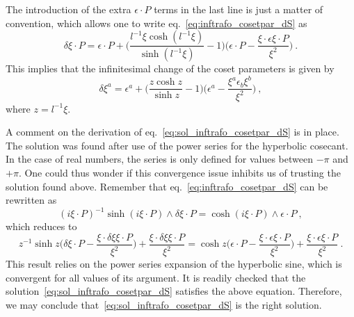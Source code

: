 \documentclass[11pt]{article}
\begin{document}
The introduction of the extra $\epsilon\cdot P$ terms in the last 
line is just a matter of convention, which allows one to write 
eq.~\eqref{eq:inftrafo_cosetpar_dS} as
\begin{equation}\label{eq:sol_inftrafo_cosetpar_dS}
	\delta\xi \cdot P = \epsilon\cdot P + 
	\bigg(\frac{l^{-1}\xi\cosh(l^{-1}\xi)}{\sinh(l^{-1}\xi)} - 
	1\bigg) \bigg(\epsilon\cdot P - \frac{\xi\cdot\epsilon 
		\xi\cdot P}{\xi^2}\bigg)~.
\end{equation}
This implies that the infinitesimal change of the coset 
parameters is given by
%
\begin{equation}
	\delta\xi^a = \epsilon^a + \Big(\frac{z\cosh z}{\sinh z} - 
	1\Big) \bigg(\epsilon^a - \frac{\xi^a \epsilon_b 
		\xi^b}{\xi^2}\bigg)~,
\end{equation}
where $z = l^{-1}\xi$.

A comment on the derivation of 
eq.~\eqref{eq:sol_inftrafo_cosetpar_dS} is in place. The solution 
was found after use of the power series for the hyperbolic 
cosecant.  In the case of real numbers, the series is only 
defined for values between $-\pi$ and $+\pi$. One could thus 
wonder if this convergence issue inhibits us of trusting the 
solution found above. Remember that 
eq.~\eqref{eq:inftrafo_cosetpar_dS} can be rewritten as
%
\begin{displaymath}
	(i\xi\cdot P)^{-1} \sinh(i\xi\cdot P) \wedge \delta\xi\cdot P 
	= \cosh(i\xi\cdot P) \wedge \epsilon\cdot P~,
\end{displaymath}
which reduces to
%
\begin{displaymath}
	z^{-1}\sinh z \Big(\delta\xi\cdot P - \frac{\xi\cdot \delta\xi 
		\xi\cdot P}{\xi^2}\Big) + \frac{\xi\cdot \delta\xi \xi\cdot 
		P}{\xi^2}
	= \cosh z \Big(\epsilon\cdot P - \frac{\xi\cdot\epsilon 
		\xi\cdot P}{\xi^2}\Big) + \frac{\xi\cdot\epsilon \xi\cdot 
		P}{\xi^2}~.
\end{displaymath}
This result relies on the power series expansion of the 
hyperbolic sine, which is convergent for all values of its 
argument. It is readily checked that the 
solution~\eqref{eq:sol_inftrafo_cosetpar_dS} satisfies the above 
equation. Therefore, we may conclude 
that~\eqref{eq:sol_inftrafo_cosetpar_dS} is the right solution. 
\end{document}
